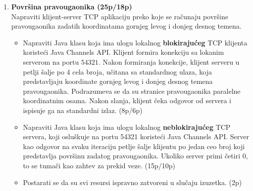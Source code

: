 \documentclass[]{article}
\begin{document}
\begin{enumerate}
\newpage

\item \textbf{Površina pravougaonika (25p/18p)}
\\Napraviti klijent-server TCP aplikaciju preko koje se računaju površine pravougaonika zadatih koordinatama gornjeg levog i donjeg desnog temena.
\begin{itemize}
    \item Napraviti Java klasu koja ima ulogu lokalnog \textbf{blokirajućeg} TCP klijenta koristeći Java Channels API. Klijent formira konekciju sa lokanim serverom na portu $54321$. Nakon formiranja konekcije, klijent serveru u petlji šalje po 4 cela broja, učitana sa standardnog ulaza, koja predstavljaju koordinate gornjeg levog i donjeg desnog temena pravougaonika. Podrazumeva se da su stranice pravougaonika paralelne koordinatnim osama. Nakon slanja, klijent čeka odgovor od servera i ispisuje ga na standardni izlaz. \hfill (8p/6p)
    \item Napraviti Java klasu koja ima ulogu lokalnog \textbf{neblokirajućeg} TCP servera, koji osluškuje na portu 54321 koristeći Java Channels API. Server kao odgovor na svaku iteraciju petlje šalje klijentu po jedan ceo broj koji predstavlja površinu zadatog pravougaonika. Ukoliko server primi četiri 0, to se tumači kao zahtev za prekid veze. \hfill (15p/10p)
    \item Postarati se da su svi resursi ispravno zatvoreni u slučaju izuzetka. \hfill (2p)
\end{itemize}

\end{enumerate}
\end{document}
